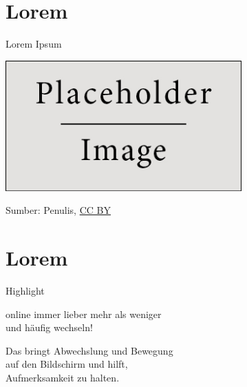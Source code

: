 \documentclass{beamer}
\begin{document}
\section{Lorem}


\begin{frame}{Lorem Ipsum}
	\small \lipsum[1][1-2]


	\begin{center}
		\includegraphics[height=5cm]{figures/placeholder}

		{\tiny \textcolor{digiPH_darkorange}{Sumber: Penulis, \href{https://creativecommons.org/licenses/by/3.0/at/}{CC BY}}}
	\end{center}
\end{frame}



\section{Lorem}

\begin{frame}{Highlight}
	\begin{center}
		\Large
		online immer lieber {\Huge mehr} als weniger\\
		und häufig wechseln!
	\end{center}
	\pause
	\begin{center}
		\Large
		Das bringt Abwechslung und Bewegung\\auf
        den Bildschirm und hilft,\\
        {\Huge Aufmerksamkeit} zu {\Huge halten}.
	\end{center}
\end{frame}
\end{document}
